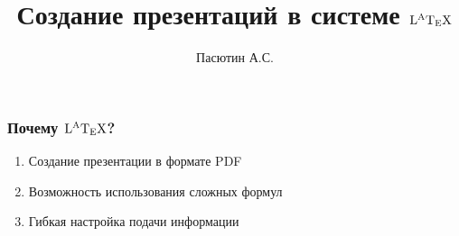 \documentclass{beamer}
\date{}
\title[]{\huge Создание презентаций в системе $\rm L^AT_EX$}
\institute[КемГУ]{\large Кемеровский государственный университет}
\author{Пасютин А.С.}
\begin{document}
\begin{frame}
	\titlepage
\end{frame}
\begin{frame}
	\frametitle{\huge Почему $\rm L^AT_EX$?}
	\begin{enumerate}
		\centering
		\Large
		\item<1-> Создание презентации в формате PDF
		\item<2-> Возможность использования сложных формул
		\item<3-> Гибкая настройка подачи информации
	\end{enumerate}
\end{frame}
\end{document}
